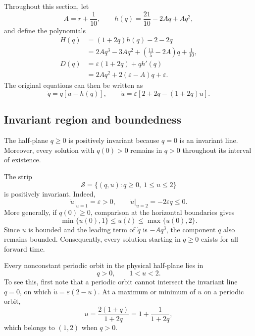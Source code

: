 \documentclass[11pt,reqno]{amsart}
\theoremstyle{plain}
\theoremstyle{definition}
\theoremstyle{remark}
\begin{document}
Throughout this section, let
\begin{equation}
A=r+\frac{1}{10},
\qquad
h(q)=\frac{21}{10}-2Aq+Aq^2,
\label{eq:A-h}
\end{equation}
and define the polynomials
\begin{equation}
\begin{aligned}
H(q)
&=(1+2q)h(q)-2-2q\\
&=2Aq^3-3Aq^2+
  \left(\frac{11}{5}-2A\right)q+\frac{1}{10},\\
D(q)
&=\varepsilon(1+2q)+qh'(q)\\
&=2Aq^2+2(\varepsilon-A)q+\varepsilon.
\end{aligned}
\label{eq:H-D}
\end{equation}
The original equations can then be written as
\begin{equation}
\dot q=q[u-h(q)],
\qquad
\dot u=\varepsilon[2+2q-(1+2q)u].
\label{eq:barkley-polynomial}
\end{equation}

\subsection{Invariant region and boundedness}
\label{subsec:invariance}

The half-plane $q\geq0$ is positively invariant because
$q=0$ is an invariant line. Moreover, every solution with
$q(0)>0$ remains in $q>0$ throughout its interval of existence.

The strip
\begin{equation}
\mathcal S=\{(q,u):q\geq0,\ 1\leq u\leq2\}
\label{eq:physical-strip}
\end{equation}
is positively invariant. Indeed,
\[
\left.\dot u\right|_{u=1}=\varepsilon>0,
\qquad
\left.\dot u\right|_{u=2}=-2\varepsilon q\leq0.
\]
More generally, if $q(0)\geq0$, comparison at the horizontal
boundaries gives
\[
\min\{u(0),1\}\leq u(t)\leq\max\{u(0),2\}.
\]
Since $u$ is bounded and the leading term of $\dot q$ is
$-Aq^3$, the component $q$ also remains bounded.
Consequently, every solution starting in $q\geq0$ exists
for all forward time.

Every nonconstant periodic orbit in the physical half-plane
lies in
\begin{equation}
q>0,\qquad 1<u<2.
\label{eq:cycle-strip}
\end{equation}
To see this, first note that a periodic orbit cannot intersect
the invariant line $q=0$, on which
$\dot u=\varepsilon(2-u)$.
At a maximum or minimum of $u$ on a periodic orbit,
\[
u=\frac{2(1+q)}{1+2q}
  =1+\frac{1}{1+2q},
\]
which belongs to $(1,2)$ when $q>0$.
\end{document}
